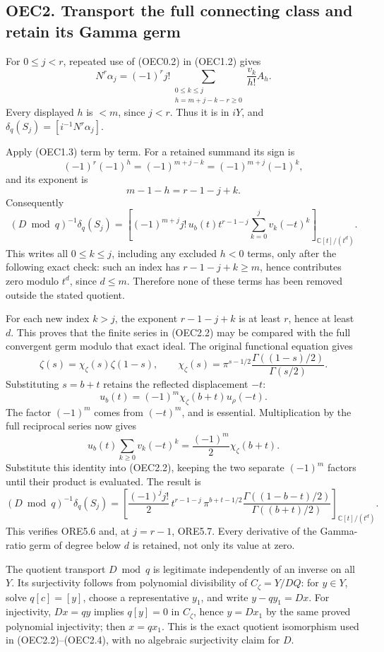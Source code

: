 \subsection{OEC2. Transport the full connecting class and retain its
Gamma
germ}\label{oec2.-transport-the-full-connecting-class-and-retain-its-gamma-germ}

For \(0\le j<r\), repeated use of (OEC0.2) in (OEC1.2) gives \[
 N^r\alpha_j
 =(-1)^rj!\!
 \sum_{\substack{0\le k\le j\\h=m+j-k-r\ge0}}
 \frac{v_k}{h!}A_h.
 \tag{OEC2.1}
\] Every displayed \(h\) is \(<m\), since \(j<r\). Thus it is in \(iY\),
and \(\delta_q(S_j)=[i^{-1}N^r\alpha_j]\).

Apply (OEC1.3) term by term. For a retained summand its sign is \[
 (-1)^r(-1)^h=(-1)^{m+j-k}
               =(-1)^{m+j}(-1)^k,
\] and its exponent is \[
 m-1-h=r-1-j+k.
\] Consequently \[
 (D\bmod q)^{-1}\delta_q(S_j)
 =
 \left[
 (-1)^{m+j}j!\,u_b(t)t^{r-1-j}
 \sum_{k=0}^jv_k(-t)^k
 \right]_{\mathbb C[t]/(t^d)} .
 \tag{OEC2.2}
\] This writes all \(0\le k\le j\), including any excluded \(h<0\)
terms, only after the following exact check: such an index has
\(r-1-j+k\ge m\), hence contributes zero modulo \(t^d\), since
\(d\le m\). Therefore none of these terms has been removed outside the
stated quotient.

For each new index \(k>j\), the exponent \(r-1-j+k\) is at least \(r\),
hence at least \(d\). This proves that the finite series in (OEC2.2) may
be compared with the full convergent germ modulo that exact ideal. The
original functional equation gives \[
 \zeta(s)=\chi_\zeta(s)\zeta(1-s),\qquad
 \chi_\zeta(s)=
 \pi^{s-1/2}
 \frac{\Gamma((1-s)/2)}{\Gamma(s/2)} .
\] Substituting \(s=b+t\) retains the reflected displacement \(-t\): \[
 u_b(t)=(-1)^m\chi_\zeta(b+t)u_\rho(-t).
 \tag{OEC2.3}
\] The factor \((-1)^m\) comes from \((-t)^m\), and is essential.
Multiplication by the full reciprocal series now gives \[
 u_b(t)\sum_{k\ge0}v_k(-t)^k
 =\frac{(-1)^m}{2}\chi_\zeta(b+t).
\] Substitute this identity into (OEC2.2), keeping the two separate
\((-1)^m\) factors until their product is evaluated. The result is \[
 \boxed{
 (D\bmod q)^{-1}\delta_q(S_j)
 =
 \left[
 \frac{(-1)^j j!}{2}\,
 t^{r-1-j}\,
 \pi^{b+t-1/2}
 \frac{\Gamma((1-b-t)/2)}{\Gamma((b+t)/2)}
 \right]_{\mathbb C[t]/(t^d)} .
 }
 \tag{OEC2.4}
\] This verifies ORE5.6 and, at \(j=r-1\), ORE5.7. Every derivative of
the Gamma-ratio germ of degree below \(d\) is retained, not only its
value at zero.

The quotient transport \(D\bmod q\) is legitimate independently of an
inverse on all \(Y\). Its surjectivity follows from polynomial
divisibility of \(C_\zeta=Y/DQ\): for \(y\in Y\), solve \(q[c]=[y]\),
choose a representative \(y_1\), and write \(y-qy_1=Dx\). For
injectivity, \(Dx=qy\) implies \(q[y]=0\) in \(C_\zeta\), hence
\(y=Dx_1\) by the same proved polynomial injectivity; then \(x=qx_1\).
This is the exact quotient isomorphism used in (OEC2.2)--(OEC2.4), with
no algebraic surjectivity claim for \(D\).

